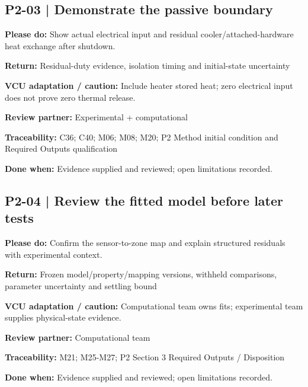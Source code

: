 \documentclass[11pt]{article}
\begin{document}
\par\noindent\begin{minipage}{\textwidth}\small\setlength{\parskip}{2pt}
\subsection*{P2-03 | Demonstrate the passive boundary}
\textbf{Please do:} Show actual electrical input and residual cooler/attached-hardware heat exchange after shutdown.\par
\textbf{Return:} Residual-duty evidence, isolation timing and initial-state uncertainty\par
\textbf{VCU adaptation / caution:} Include heater stored heat; zero electrical input does not prove zero thermal release.\par
\textbf{Review partner:} Experimental + computational\par
\textbf{Traceability:} C36; C40; M06; M08; M20; P2 Method initial condition and Required Outputs qualification\par
\textbf{Done when:} Evidence supplied and reviewed; open limitations recorded.\par
\end{minipage}\par\vspace{8pt}
\par\noindent\begin{minipage}{\textwidth}\small\setlength{\parskip}{2pt}
\subsection*{P2-04 | Review the fitted model before later tests}
\textbf{Please do:} Confirm the sensor-to-zone map and explain structured residuals with experimental context.\par
\textbf{Return:} Frozen model/property/mapping versions, withheld comparisons, parameter uncertainty and settling bound\par
\textbf{VCU adaptation / caution:} Computational team owns fits; experimental team supplies physical-state evidence.\par
\textbf{Review partner:} Computational team\par
\textbf{Traceability:} M21; M25-M27; P2 Section 3 Required Outputs / Disposition\par
\textbf{Done when:} Evidence supplied and reviewed; open limitations recorded.\par
\end{minipage}\par\vspace{8pt}
\end{document}
